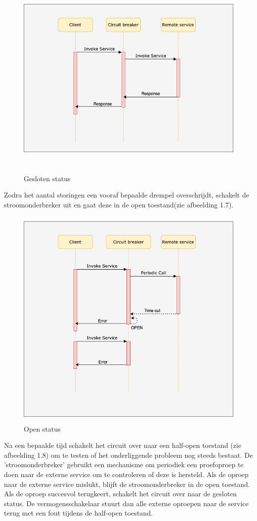 \begin{figure}[!htb]
    \caption{Gesloten status}
    \centering
    \includegraphics[height=10cm]{closed.png}
\end{figure}

Zodra het aantal storingen een vooraf bepaalde drempel overschrijdt, schakelt de stroomonderbreker uit en gaat deze in de open toestand(zie afbeelding 1.7).
\begin{figure}[!htb]
    \caption{Open status}
    \centering
    \includegraphics[height=11cm]{open.png}
\end{figure}

Na een bepaalde tijd schakelt het circuit over naar een half-open toestand (zie afbeelding 1.8) om te testen of het onderliggende probleem nog steeds bestaat. De 'stroomonderbreker' gebruikt een mechanisme om periodiek een proefoproep te doen naar de externe service om te controleren of deze is hersteld. Als de oproep naar de externe service mislukt, blijft de stroomonderbreker in de open toestand. Als de oproep succesvol terugkeert, schakelt het circuit over naar de gesloten status. De vermogensschakelaar stuurt dan alle externe oproepen naar de service terug met een fout tijdens de half-open toestand.

